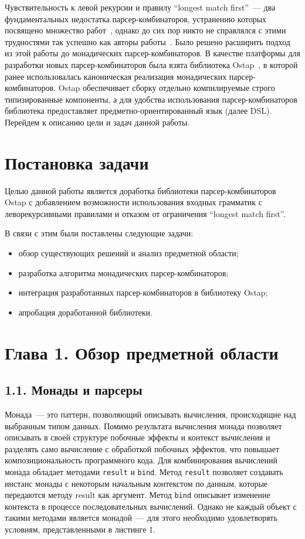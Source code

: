 Чувствительность к левой рекурсии и правилу ``longest match first''~--- два фундаментальных недостатка парсер-комбинаторов, устранению которых посвящено множество работ~\cite{frost,tratt,warth}, однако до сих пор никто не справлялся с этими трудностями так успешно как авторы работы~\cite{meerkat}. Было решено расширить подход из этой работы до монадических парсер-комбинаторов. В качестве платформы для разработки новых парсер-комбинаторов была взята библиотека Ostap~\cite{ostap}, в которой ранее использовалась каноническая реализация монадических парсер-комбинаторов. Ostap обеспечивает сборку отдельно компилируемые строго типизированные компоненты, а для удобства использования парсер-комбинаторов библиотека предоставляет предметно-ориентированный язык (далее DSL).
Перейдем к описанию цели и задач данной работы.

\section*{Постановка задачи}

Целью данной работы является доработка библиотеки парсер-комбинаторов Ostap с добавлением возможности использования входных грамматик с леворекурсивными правилами и отказом от ограничения ``longest match first''.

В связи с этим были поставлены следующие задачи:
\begin{itemize}
    \item обзор существующих решений и анализ предметной области;
    \item разработка алгоритма монадических парсер-комбинаторов;
    \item интеграция разработанных парсер-комбинаторов в библиотеку Ostap;
    \item апробация доработанной библиотеки.
\end{itemize}

\section*{Глава 1. Обзор предметной области}

\subsection*{1.1. Монады и парсеры}

Монада~--- это паттерн, позволяющий описывать вычисления, происходящие над выбранным типом данных. Помимо результата вычисления монада позволяет описывать в своей структуре побочные эффекты и контекст вычисления и разделять само вычисление с обработкой побочных эффектов, что повышает композициональность программного кода. Для комбинирования вычислений монада обладает методами \lstinline|result| и \lstinline|bind|. Метод \lstinline|result| позволяет создавать инстанс монады с некоторым начальным контекстом по данным, которые передаются методу result как аргумент. Метод \lstinline|bind| описывает изменение контекста в процессе последовательных вычислений. Однако не каждый объект с такими методами является монадой~--- для этого необходимо удовлетворять условиям, представленными в листинге 1.

